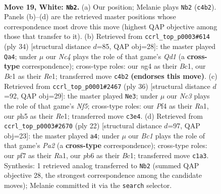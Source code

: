 \documentclass[11pt]{article}
\begin{document}
\clearpage

\begin{figure}[p]\centering
\begin{subfigure}{0.46\textwidth}\centering
\resizebox{\linewidth}{!}{%
\newchessgame
\chessboard[
  setfen={2r1b1k1/p1qr1pp1/npp1p3/7p/PbNP1Pn1/1PNQ2P1/4P2P/R1B1RBK1 w - - 8 19},
  showmover=false,
  pgfstyle=straightmove, color=movearrow, markmove={c4-b2}
]}
\caption{}
\end{subfigure}\hfill
\begin{subfigure}{0.46\textwidth}\centering
\resizebox{\linewidth}{!}{%
\newchessgame
\chessboard[
  setfen={rqr3k1/4bppp/bp2pn2/pN2p3/1PP1P3/P4P2/6PP/1RBQRBK1 w - - 2 18},
  showmover=false,
  pgfstyle=straightmove, color=movearrow, markmove={d1-a4}
]}
\caption{}
\end{subfigure}
\\[4pt]
\begin{subfigure}{0.46\textwidth}\centering
\resizebox{\linewidth}{!}{%
\newchessgame
\chessboard[
  setfen={r3rqk1/pbpn1p1p/1p1p2p1/nP3N2/2P1PP2/6P1/P1QN2BP/R3R1K1 w - - 0 19},
  showmover=false,
  pgfstyle=straightmove, color=movearrow, markmove={f5-e3}
]}
\caption{}
\end{subfigure}\hfill
\begin{subfigure}{0.46\textwidth}\centering
\resizebox{\linewidth}{!}{%
\newchessgame
\chessboard[
  setfen={r2qkb1r/ppp2ppp/3pb3/2nNp3/2P1P3/1P3Q1P/P1P1NPP1/R1B1K2R w KQkq - 7 12},
  showmover=false,
  pgfstyle=straightmove, color=movearrow, markmove={a2-a4}
]}
\caption{}
\end{subfigure}
\caption{\textbf{Move 19, White: \texttt{Nb2}.} (a) Our position; Melanie plays \texttt{Nb2} (\texttt{c4b2}). Panels (b)--(d) are the retrieved master positions whose correspondence most drove this move (highest QAP objective among those that transfer to it). (b) Retrieved from \texttt{ccrl\_top\_p0003\#614} (ply 34) [structural distance $d$=85, QAP obj=28]: the master played \texttt{Qa4}; under $\mu$ our \emph{Nc4} plays the role of that game's \emph{Qd1} (a \textbf{cross-type} correspondence); cross-type roles: our \emph{n}g4 as their \emph{B}c1, our \emph{B}c1 as their \emph{R}e1; transferred move \texttt{c4b2} \textbf{(endorses this move)}. (c) Retrieved from \texttt{ccrl\_top\_p0001\#2467} (ply 36) [structural distance $d$=92, QAP obj=29]: the master played \texttt{Ne3}; under $\mu$ our \emph{Nc3} plays the role of that game's \emph{Nf5}; cross-type roles: our \emph{P}f4 as their \emph{R}a1, our \emph{p}h5 as their \emph{R}e1; transferred move \texttt{c3e4}. (d) Retrieved from \texttt{ccrl\_top\_p0003\#2670} (ply 22) [structural distance $d$=97, QAP obj=23]: the master played \texttt{a4}; under $\mu$ our \emph{Bc1} plays the role of that game's \emph{Pa2} (a \textbf{cross-type} correspondence); cross-type roles: our \emph{p}f7 as their \emph{R}a1, our \emph{p}b6 as their \emph{B}c1; transferred move \texttt{c1a3}. Synthesis: 1 retrieved analog transferred to \texttt{Nb2} (summed QAP objective 28, the strongest correspondence among the candidate moves); Melanie committed it via the \texttt{search} selector.}
\label{fig:thought-m36}
\end{figure}
\end{document}
